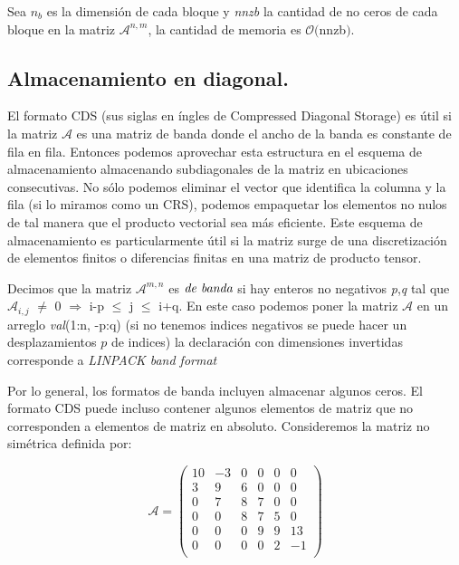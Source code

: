 \documentclass[a4paper,openright,12pt, oneside]{book}
\DeclareRobustCommand{\orderof}{\ensuremath{\mathcal{O}}}
\newcommand{\implica}{\Rightarrow}
\begin{document}
Sea \textit{$n_{b}$} es la dimensi\'on de cada bloque y \textit{nnzb} la cantidad de no ceros de cada bloque en la matriz $\mathcal{A}^{n,m}$, la cantidad de memoria es $\orderof($nnz$ $b$)$.

\subsection{Almacenamiento en diagonal.}\label{CDS}


El formato CDS (sus siglas en \'ingles de Compressed Diagonal Storage) es \'util si la matriz $\mathcal{A}$ es una matriz de banda donde el ancho de la banda es constante de fila en fila. Entonces podemos aprovechar esta estructura en el esquema de almacenamiento almacenando subdiagonales de la matriz en ubicaciones consecutivas. No s\'olo podemos eliminar el vector que identifica la columna y la fila (si lo miramos como un CRS), podemos empaquetar los elementos no nulos de tal manera que el producto vectorial sea m\'as eficiente. Este esquema de almacenamiento es particularmente \'util si la matriz surge de una discretizaci\'on de elementos finitos o diferencias finitas en una matriz de producto tensor.

Decimos que la matriz $\mathcal{A}^{m,n}$ es $\emph{de banda}$ si hay enteros no negativos \textit{p},\textit{q} tal que 
$\mathcal{A}_{i,j}$ $\neq$ 0 $\implica$ i{-}p $\leq$ j $\leq$ i{+}q. 
En este caso podemos poner la matriz $\mathcal{A}$ en un arreglo \textit{val}(1:n, -p:q) (si no tenemos indices negativos se puede hacer un desplazamientos $p$ de indices) la declaraci\'on con dimensiones invertidas corresponde a \textit{LINPACK band format} \cite{LINPACK}

Por lo general, los formatos de banda incluyen almacenar algunos ceros. El formato CDS puede incluso contener algunos elementos de matriz que no corresponden a elementos de matriz en absoluto. Consideremos la matriz no sim\'etrica definida por:

\begin{equation}
\mathcal{A} =
\left(
\begin{array}{cccccc}
 
10& -3& 0& 0& 0& 0\\
3&   9& 6& 0& 0& 0 \\
0&   7& 8& 7& 0& 0 \\
0&   0& 8& 7& 5& 0 \\
0&   0& 0& 9& 9& 13 \\
0&   0& 0& 0& 2& -1 \\
\end{array}
\right)
\end{equation}
\end{document}
